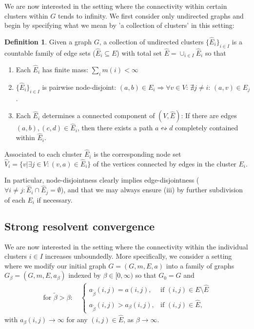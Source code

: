 \documentclass[reqno,12pt,letterpaper]{amsart}
\numberwithin{equation}{section}
\newcommand{\1}{\mathds{1}}
\theoremstyle{definition}
\newtheorem{Def}[Th]{Definition}
\begin{document}
	We are now interested in the setting where the connectivity within certain clusters within $G$ tends to infinity. 
	We first consider only undirected graphs and begin by specifying what we mean by 'a collection of clusters' in this setting:
	\begin{Def}\label{clusters} Given a graph $G$, a collection of undirected clusters $\{\hat E_i\}_{i \in I}$ is a countable family  of edge sets ($\hat E_i \subseteq E$) with total set $\hat{E} = \cup_{i \in I} \hat{E}_i$ so that 
		\begin{enumerate}[label=(\roman*), topsep=0pt, itemsep=-1em]
			\item Each $\hat E_i$ has finite mass: $ \sum_i m(i) < \infty$\\
			\item $\{\hat E_i\}_{i \in I}$ is pairwise node-disjoint:  $(a,b) \in E_i \Rightarrow \forall v \in V$: $\nexists j \neq i$: $(a,v) \in \hat E_j$.\\
			\item Each $\hat E_i$ determines a connected component of $(V,\hat E)$: If there are edges $(a,b), (c,d) \in \hat E_i$, then there exists a path $a \leftrightsquigarrow d $ completely contained within $\hat E_i$.  
		\end{enumerate}
Associated to each cluster $\hat E_i$ is the corresponding node set $\hat{V}_i =  \{v| \exists j \in V: (v,a) \in \hat E_i  \}$ of the vertices connected by edges in the cluster  $E_i$.
	\end{Def}
In particular, node-disjointness clearly implies edge-disjointness ($\forall i \neq j: \hat E_i \cap \hat E_j = \emptyset$), and that we may always ensure (iii) by further subdivision of each $E_i$ if necessary.
	 
	 
	 
	 

	
	\subsection{Strong resolvent convergence}\label{undirected_strong_resolvent_convergence}
		We are now interested in the setting where the connectivity within the individual clusters $i \in I$ increases unboundedly.  More specifically, we consider a setting where we modify our initial graph $G = (G,m,E,a)$ into a family of graphs $G_{\beta} = (G,m,E,a_{\beta})$ indexed by $\beta \in [0,\infty)$ so that $G_0 = G$ and 
	\begin{align}\label{defining_kato_setting}
		\text{for $\tilde{\beta} >  \beta $}: 
		\quad
	\begin{cases}
				a_{\tilde{\beta}}(i,j) = a(i,j), & \text{if } (i,j) \in E\setminus \hat{E}  \\
	 a_{\tilde{\beta}}(i,j) > a_\beta(i,j), & \text{if }  (i,j) \in  \hat{E},
	\end{cases}
	\end{align}
with $a_{\beta}(i,j) \rightarrow \infty$ for any $(i,j) \in \hat{E}$, as $\beta \rightarrow \infty$.
\end{document}
